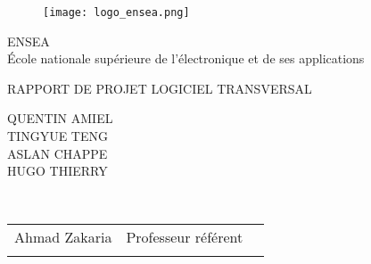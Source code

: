 \begin{titlepage}
\centering
\vspace*{-2cm}


\begin{figure}[htbp]
\centering
\texttt{[image: logo\_ensea.png]}

\end{figure}
\begin{center}
	\vspace{0.4cm}
	\LARGE ENSEA\\
	\vspace{0.2cm}
	\Large École nationale supérieure de l'électronique et de ses applications\\
	\vspace{0.2cm}
	
    \begin{center}
		\vspace{1cm}
		RAPPORT DE PROJET LOGICIEL TRANSVERSAL\\
    \end{center}
	\vspace{0.4cm}
    
    \begin{center}
        \vspace{0.4cm}
        \Large QUENTIN AMIEL\\
        \Large TINGYUE TENG\\
        \Large ASLAN CHAPPE\\
        \Large HUGO THIERRY\\
        \vspace{1cm}
			
        \vspace{0.8cm}
        \large 
    \end{center}
	\vspace{1cm}
    \large \\
\end{center}

\vspace{0.2cm} \normalsize
\begin{center}
\begin{tabular}{lll}
	Ahmad Zakaria & Professeur référent \\
    \vspace{0.1cm}
	
\end{tabular}
\end{center}
\end{titlepage}
